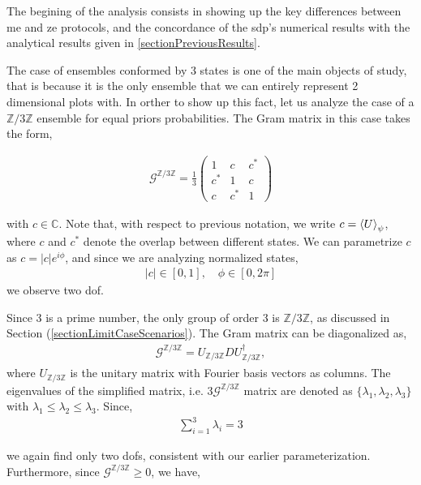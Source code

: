 \documentclass[12pt,letterpaper]{article}
\begin{document}
\hspace{20pt}The begining of the analysis consists in showing up the key differences between \gls{me} and \gls{ze} protocols, and the concordance of the \gls{sdp}'s numerical results with the analytical results given in \ref{sectionPreviousResults}.

The case of ensembles conformed by 3 states is one of the main objects of study, that is because it is the only ensemble that we can entirely represent 2 dimensional plots with. In orther to show up this fact, let us analyze the case of a $\mathbb{Z}/3\mathbb{Z}$ ensemble for equal priors probabilities. The Gram matrix in this case takes the form,

\begin{align*}
	\mathcal{G}^{\mathbb{Z}/3\mathbb{Z}}=\frac{1}{3}\begin{pmatrix}
		1 & c & c^*\\
		c^* & 1 & c\\
		c & c^* & 1
	\end{pmatrix}
\end{align*}

with $c \in \mathbb{C}$. Note that, with respect to previous notation, we write $c = \braket{U}_{\psi}$, where $c$ and $c^*$ denote the overlap between different states. We can parametrize $c$ as $c = |c|e^{i\phi}$, and since we are analyzing normalized states,
\begin{align*}
	|c|\in [0,1], \quad \phi\in[0,2\pi]
\end{align*}
we observe two \gls{dof}.

Since 3 is a prime number, the only group of order 3 is $\mathbb{Z}/3\mathbb{Z}$, as discussed in Section (\ref{sectionLimitCaseScenarios}). The Gram matrix can be diagonalized as,
\begin{align*}
	\mathcal{G}^{\mathbb{Z}/3\mathbb{Z}} = U_{\mathbb{Z}/3\mathbb{Z}} D U_{\mathbb{Z}/3\mathbb{Z}}^\dagger,
\end{align*}
where $U_{\mathbb{Z}/3\mathbb{Z}}$ is the unitary matrix with Fourier basis vectors as columns. The eigenvalues of the simplified matrix, i.e. $3\mathcal{G}^{\mathbb{Z}/3\mathbb{Z}}$ matrix are denoted as $\{\lambda_1,\lambda_2,\lambda_3\}$ with $\lambda_1 \leq \lambda_2 \leq \lambda_3$. Since,
\begin{align*}
	\sum_{i=1}^3 \lambda_i = 3
\end{align*}

we again find only two \glspl{dof}, consistent with our earlier parameterization. Furthermore, since $\mathcal{G}^{\mathbb{Z}/3\mathbb{Z}} \geq 0$, we have,
\end{document}
